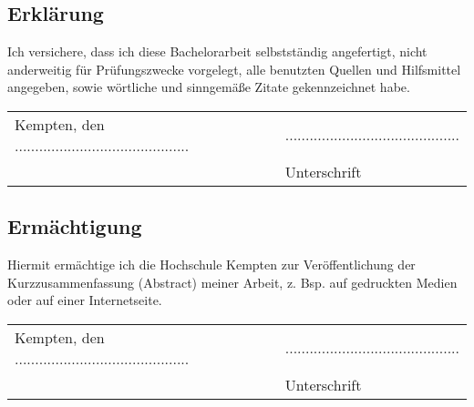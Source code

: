 \documentclass[12pt]{article}
\begin{document}
\subsection{Erklärung}
Ich versichere, dass ich diese Bachelorarbeit selbstständig angefertigt, nicht anderweitig für Prüfungszwecke vorgelegt, alle benutzten Quellen und Hilfsmittel angegeben, sowie wörtliche und sinngemäße Zitate gekennzeichnet habe.

\vspace{2cm}
\begin{longtable}{p{}p{}}
Kempten, den ........................................... & ........................................... \\
 & Unterschrift \\
\end{longtable}
\vspace{5cm}

\subsection{Ermächtigung}
Hiermit ermächtige ich die Hochschule Kempten zur Veröffentlichung der Kurzzusammenfassung (Abstract) meiner Arbeit, z. Bsp. auf gedruckten Medien oder auf einer Internetseite.

\vspace{2cm}
\begin{longtable}{p{}p{}}
Kempten, den ........................................... & ........................................... \\
 & Unterschrift \\
\end{longtable}
\end{document}
